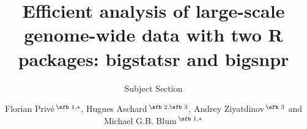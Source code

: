\documentclass{bioinfo}
\begin{document}

\subtitle{Subject Section}

\title[R packages for analyzing genome-wide data]{Efficient analysis of large-scale genome-wide data with two R packages: bigstatsr and bigsnpr}
\author[Priv\'e \textit{et~al}.]{Florian Priv\'e\,$^{\text{\sfb 1,}*}$, Hugues Aschard\,$^{\text{\sfb 2,\sfb 3}}$, Andrey Ziyatdinov\,$^{\text{\sfb 3}}$ and Michael G.B. Blum\,$^{\text{\sfb 1,}*}$}
\address{$^{\text{\sf 1}}$Univ.\ Grenoble Alpes, CNRS, Laboratoire TIMC-IMAG, UMR 5525, France, \\
$^{\text{\sf 2}}$Centre de Bioinformatique, Biostatistique et Biologie Int\'egrative (C3BI), Institut Pasteur, Paris, France, \\
$^{\text{\sf 3}}$Department of Epidemiology, Harvard T.H. Chan School of Public Health, Boston, Massachusetts, USA.}



\end{document}
